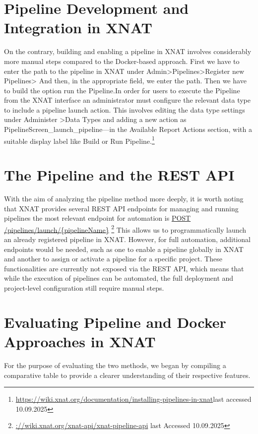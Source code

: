 \section{Pipeline Development and Integration in XNAT}
On the contrary, building and enabling a pipeline in XNAT involves considerably more manual steps compared to the Docker-based approach.
First we have to enter the path to the pipeline in XNAT under Admin>Pipelines>Register new Pipelines> And then, in the appropriate field, we enter the path. Then we have to build the option run the Pipeline.In order for users to execute the Pipeline from the XNAT interface an administrator must configure the relevant data type to include a pipeline launch action. This involves editing the data type settings under Administer >Data Types and adding a new action as PipelineScreen\_launch\_pipeline—in the Available Report Actions section, with a suitable display label like Build or Run Pipeline.\footnote{\url{https://wiki.xnat.org/documentation/installing-pipelines-in-xnat}last accessed 10.09.2025}

\section{The Pipeline and the REST API}
With the aim of analyzing the pipeline method more deeply, it is worth noting that XNAT provides several REST API endpoints for managing and running pipelines the most relevant endpoint for automation is \url{POST /pipelines/launch/{pipelineName}} \footnote{\url{://wiki.xnat.org/xnat-api/xnat-pipeline-api} last Accessed 10.09.2025}
This allows us to programmatically launch an already registered pipeline in XNAT. However, for full
automation, additional endpoints would be needed, such as one to enable a pipeline globally in XNAT and
another to assign or activate a pipeline for a specific project. These functionalities are currently not exposed via
the REST API, which means that while the execution of pipelines can be automated, the full deployment and
project-level configuration still require manual steps.

\section{Evaluating Pipeline and Docker Approaches in XNAT}

For the purpose of evaluating the two methods, we began by compiling a comparative table to provide a clearer understanding of their respective features. 

